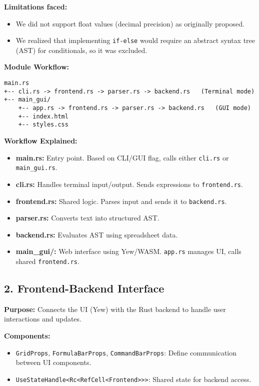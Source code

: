 \documentclass{article}
\begin{document}
\textbf{Limitations faced:}
\begin{itemize}
    \item We did not support float values (decimal precision) as originally proposed.
    \item We realized that implementing \texttt{if-else} would require an abstract syntax tree (AST) for conditionals, so it was excluded.
\end{itemize}

\textbf{Module Workflow:}
\begin{lstlisting}
main.rs
+-- cli.rs -> frontend.rs -> parser.rs -> backend.rs   (Terminal mode)
+-- main_gui/
    +-- app.rs -> frontend.rs -> parser.rs -> backend.rs   (GUI mode)
    +-- index.html
    +-- styles.css
\end{lstlisting}

\textbf{Workflow Explained:}
\begin{itemize}
    \item \textbf{main.rs:} Entry point. Based on CLI/GUI flag, calls either \texttt{cli.rs} or \texttt{main\_gui.rs}.
    \item \textbf{cli.rs:} Handles terminal input/output. Sends expressions to \texttt{frontend.rs}.
    \item \textbf{frontend.rs:} Shared logic. Parses input and sends it to \texttt{backend.rs}.
    \item \textbf{parser.rs:} Converts text into structured AST.
    \item \textbf{backend.rs:} Evaluates AST using spreadsheet data.
    \item \textbf{main\_gui/:} Web interface using Yew/WASM. \texttt{app.rs} manages UI, calls shared \texttt{frontend.rs}.
\end{itemize}

\subsection*{2. Frontend-Backend Interface}
\textbf{Purpose:} Connects the UI (Yew) with the Rust backend to handle user interactions and updates.

\textbf{Components:}
\begin{itemize}
    \item \texttt{GridProps}, \texttt{FormulaBarProps}, \texttt{CommandBarProps}: Define communication between UI components.
    \item \texttt{UseStateHandle<Rc<RefCell<Frontend>>>}: Shared state for backend access.
\end{itemize}
\end{document}
